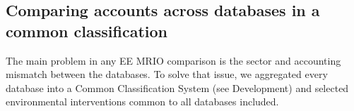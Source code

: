 \subsection{Comparing accounts across databases in a common classification}

The main problem in any EE MRIO comparison is the sector and accounting
mismatch between the databases. To solve that issue, we aggregated every
database into a Common Classification System (see Development) and
selected environmental interventions common to all databases included.
